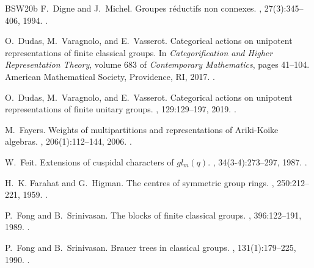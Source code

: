 \documentclass[12pt]{amsart}
\numberwithin{itemcounter}{subsection}
\theoremstyle{plain}
\theoremstyle{definition}
\theoremstyle{remark}
\numberwithin{equation}{section}
\begin{document}
\begin{thebibliography}{BSW20b}
F.~Digne and J.~Michel.
\newblock Groupes r\'eductifs non connexes.
, 27(3):345--406, 1994.
\newblock \href{https://doi.org/10.24033/asens.1696}
  {}.

O.~Dudas, M.~Varagnolo, and E.~Vasserot.
\newblock Categorical actions on unipotent representations of finite classical
  groups.
\newblock In {\em Categorification and Higher Representation Theory}, volume
  683 of {\em Contemporary Mathematics}, pages 41--104. American Mathematical
  Society, Providence, RI, 2017.
\newblock \href {https://doi.org/10.1090/conm/683/13700}
  {}.

O.~Dudas, M.~Varagnolo, and E.~Vasserot.
\newblock Categorical actions on unipotent representations of finite unitary
  groups.
, 129:129--197, 2019.
\newblock \href {https://doi.org/10.1007/s10240-019-00104-x}
  {}.

M.~Fayers.
\newblock Weights of multipartitions and representations of {A}riki-{K}oike
  algebras.
, 206(1):112--144, 2006.
\newblock \href {https://doi.org/10.1016/j.aim.2005.07.017}
  {}.

W.~Feit.
\newblock Extensions of cuspidal characters of $gl_m(q)$.
, 34(3-4):273--297, 1987.
\newblock \href {https://doi.org/10.5486/pmd.1987.34.3-4.12}
  {}.

H.~K. Farahat and G.~Higman.
\newblock The centres of symmetric group rings.
, 250:212--221, 1959.
\newblock \href {https://doi.org/10.1098/rspa.1959.0060}
  {}.

P.~Fong and B.~Srinivasan.
\newblock The blocks of finite classical groups.
, 396:122--191, 1989.
\newblock \href {https://doi.org/10.1515/crll.1989.396.122}
  {}.

P.~Fong and B.~Srinivasan.
\newblock Brauer trees in classical groups.
, 131(1):179--225, 1990.
\newblock \href {https://doi.org/10.1016/0021-8693(90)90192-8}
  {}.


\end{thebibliography}
\end{document}
